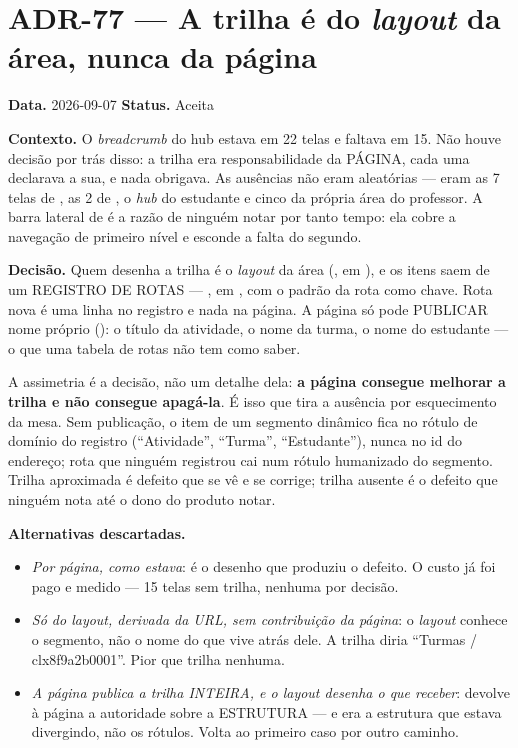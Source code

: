\section{ADR-77 --- A trilha é do \emph{layout} da área, nunca da página}
\label{adr:77}

\textbf{Data.} 2026-09-07 \quad \textbf{Status.} Aceita

\textbf{Contexto.} O \emph{breadcrumb} do hub estava em 22 telas e faltava em 15.
Não houve decisão por trás disso: a trilha era responsabilidade da PÁGINA, cada
uma declarava a sua, e nada obrigava. As ausências não eram aleatórias --- eram as
7 telas de , as 2 de , o \emph{hub} do estudante e
cinco da própria área do professor. A barra lateral de  é a razão de
ninguém notar por tanto tempo: ela cobre a navegação de primeiro nível e esconde
a falta do segundo.

\textbf{Decisão.} Quem desenha a trilha é o \emph{layout} da área
(, em ), e os itens saem de um
REGISTRO DE ROTAS --- , em , com o padrão da rota como
chave. Rota nova é uma linha no registro e nada na página. A página só pode
PUBLICAR nome próprio (): o título da atividade, o nome da
turma, o nome do estudante --- o que uma tabela de rotas não tem como saber.

A assimetria é a decisão, não um detalhe dela: \textbf{a página consegue melhorar
a trilha e não consegue apagá-la}. É isso que tira a ausência por esquecimento da
mesa. Sem publicação, o item de um segmento dinâmico fica no rótulo de domínio do
registro (\enquote{Atividade}, \enquote{Turma}, \enquote{Estudante}), nunca no id
do endereço; rota que ninguém registrou cai num rótulo humanizado do segmento.
Trilha aproximada é defeito que se vê e se corrige; trilha ausente é o defeito
que ninguém nota até o dono do produto notar.

\textbf{Alternativas descartadas.}
\begin{itemize}
  \item \emph{Por página, como estava}: é o desenho que produziu o defeito. O
    custo já foi pago e medido --- 15 telas sem trilha, nenhuma por decisão.
  \item \emph{Só do \emph{layout}, derivada da URL, sem contribuição da página}:
    o \emph{layout} conhece o segmento, não o nome do que vive atrás dele. A
    trilha diria \enquote{Turmas / clx8f9a2b0001}. Pior que trilha nenhuma.
  \item \emph{A página publica a trilha INTEIRA, e o \emph{layout} desenha o que
    receber}: devolve à página a autoridade sobre a ESTRUTURA --- e era a
    estrutura que estava divergindo, não os rótulos. Volta ao primeiro caso por
    outro caminho.
\end{itemize}


